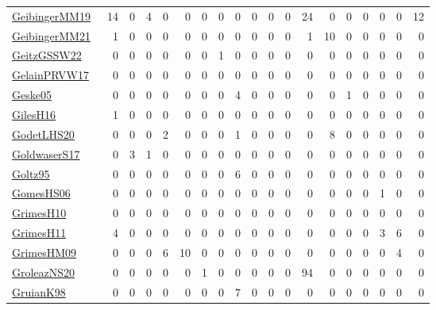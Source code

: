 {\begin{longtable}{l*{18}{r}}
\href{papers/GeibingerMM19.pdf}{GeibingerMM19}~\cite{GeibingerMM19} & 14 & 0 & 4 & 0 & 0 & 0 & 0 & 0 & 0 & 0 & 0 & 24 & 0 & 0 & 0 & 0 & 0 & 12\\
\href{papers/GeibingerMM21.pdf}{GeibingerMM21}~\cite{GeibingerMM21} & 1 & 0 & 0 & 0 & 0 & 0 & 0 & 0 & 0 & 0 & 0 & 1 & 10 & 0 & 0 & 0 & 0 & 0\\
\href{papers/GeitzGSSW22.pdf}{GeitzGSSW22}~\cite{GeitzGSSW22} & 0 & 0 & 0 & 0 & 0 & 0 & 1 & 0 & 0 & 0 & 0 & 0 & 0 & 0 & 0 & 0 & 0 & 0\\
\href{papers/GelainPRVW17.pdf}{GelainPRVW17}~\cite{GelainPRVW17} & 0 & 0 & 0 & 0 & 0 & 0 & 0 & 0 & 0 & 0 & 0 & 0 & 0 & 0 & 0 & 0 & 0 & 0\\
\href{papers/Geske05.pdf}{Geske05}~\cite{Geske05} & 0 & 0 & 0 & 0 & 0 & 0 & 0 & 4 & 0 & 0 & 0 & 0 & 0 & 1 & 0 & 0 & 0 & 0\\
\href{papers/GilesH16.pdf}{GilesH16}~\cite{GilesH16} & 1 & 0 & 0 & 0 & 0 & 0 & 0 & 0 & 0 & 0 & 0 & 0 & 0 & 0 & 0 & 0 & 0 & 0\\
\href{papers/GodetLHS20.pdf}{GodetLHS20}~\cite{GodetLHS20} & 0 & 0 & 0 & 2 & 0 & 0 & 0 & 1 & 0 & 0 & 0 & 0 & 8 & 0 & 0 & 0 & 0 & 0\\
\href{papers/GoldwaserS17.pdf}{GoldwaserS17}~\cite{GoldwaserS17} & 0 & 3 & 1 & 0 & 0 & 0 & 0 & 0 & 0 & 0 & 0 & 0 & 0 & 0 & 0 & 0 & 0 & 0\\
\href{papers/Goltz95.pdf}{Goltz95}~\cite{Goltz95} & 0 & 0 & 0 & 0 & 0 & 0 & 0 & 6 & 0 & 0 & 0 & 0 & 0 & 0 & 0 & 0 & 0 & 0\\
\href{papers/GomesHS06.pdf}{GomesHS06}~\cite{GomesHS06} & 0 & 0 & 0 & 0 & 0 & 0 & 0 & 0 & 0 & 0 & 0 & 0 & 0 & 0 & 0 & 1 & 0 & 0\\
\href{papers/GrimesH10.pdf}{GrimesH10}~\cite{GrimesH10} & 0 & 0 & 0 & 0 & 0 & 0 & 0 & 0 & 0 & 0 & 0 & 0 & 0 & 0 & 0 & 0 & 0 & 0\\
\href{papers/GrimesH11.pdf}{GrimesH11}~\cite{GrimesH11} & 4 & 0 & 0 & 0 & 0 & 0 & 0 & 0 & 0 & 0 & 0 & 0 & 0 & 0 & 0 & 3 & 6 & 0\\
\href{papers/GrimesHM09.pdf}{GrimesHM09}~\cite{GrimesHM09} & 0 & 0 & 0 & 6 & 10 & 0 & 0 & 0 & 0 & 0 & 0 & 0 & 0 & 0 & 0 & 0 & 4 & 0\\
\href{papers/GroleazNS20.pdf}{GroleazNS20}~\cite{GroleazNS20} & 0 & 0 & 0 & 0 & 0 & 1 & 0 & 0 & 0 & 0 & 0 & 94 & 0 & 0 & 0 & 0 & 0 & 0\\
\href{papers/GruianK98.pdf}{GruianK98}~\cite{GruianK98} & 0 & 0 & 0 & 0 & 0 & 0 & 0 & 7 & 0 & 0 & 0 & 0 & 0 & 0 & 0 & 0 & 0 & 0\\

\end{longtable}}
